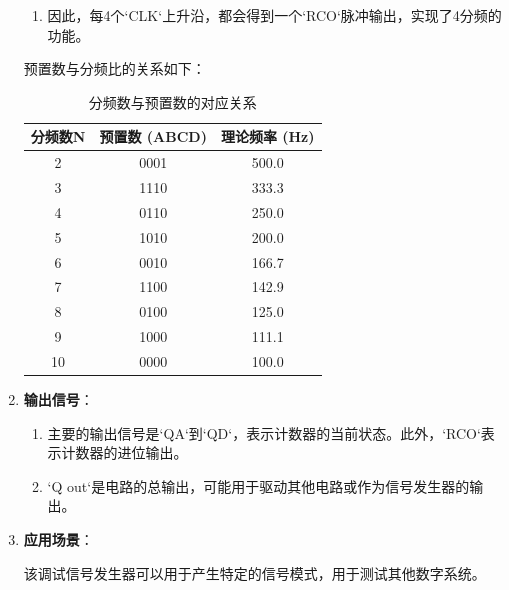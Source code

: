 \documentclass[UTF8,titlepage,a4paper]{ctexart}
\numberwithin{figure}{section}
\begin{document}
\begin{enumerate}
\begin{enumerate}
        \item 因此，每4个`CLK`上升沿，都会得到一个`RCO`脉冲输出，实现了4分频的功能。
    \end{enumerate}
    
    预置数与分频比的关系如下：
    
\begin{table}[h]
    \centering
    \begin{tabular}{|c|c|c|}
    \hline
    分频数N & 预置数 (ABCD) & 理论频率 (Hz) \\
    \hline
    2 & 0001 & 500.0 \\
    3 & 1110 & 333.3 \\
    4 & 0110 & 250.0 \\
    5 & 1010 & 200.0 \\
    6 & 0010 & 166.7 \\
    7 & 1100 & 142.9 \\
    8 & 0100 & 125.0 \\
    9 & 1000 & 111.1 \\
    10 & 0000 & 100.0 \\
    \hline
    \end{tabular}
    \caption{分频数与预置数的对应关系}
    \end{table}
    
    \item \textbf{输出信号}：
    \begin{enumerate}
        \item 主要的输出信号是`QA`到`QD`，表示计数器的当前状态。此外，`RCO`表示计数器的进位输出。
        
        \item `Q out`是电路的总输出，可能用于驱动其他电路或作为信号发生器的输出。
    \end{enumerate}

    \item \textbf{应用场景}：

    该调试信号发生器可以用于产生特定的信号模式，用于测试其他数字系统。


\end{enumerate}
\end{document}
